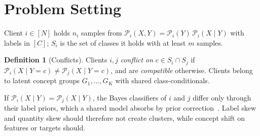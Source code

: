 \documentclass[journal]{IEEEtran}
\theoremstyle{definition}
\newtheorem{definition}{Definition}
\newcommand{\cP}{\mathcal{P}}
\begin{document}
\begin{table}[t]
\centering
\caption{Positioning. Cat.: server-/client-side/metadata. LS: invariant to label skew by design. QS: treats quantity skew. Priv.: formal privacy of the clustering signal. Expl./Cert.: explanations/certificates of the grouping. ``--'': not claimed as far as we could verify.}\label{tab:position}
\scriptsize\setlength{\tabcolsep}{2pt}
\end{table}

\section{Problem Setting}\label{sec:setting}
Client $i\in[N]$ holds $n_i$ samples from $\cP_i(X,Y)=\cP_i(Y)\,\cP_i(X\mid Y)$ with labels in $[C]$; $S_i$ is the set of classes it holds with at least $m$ samples.
\begin{definition}[Conflicts]\label{def:concept}
Clients $i,j$ \emph{conflict on} $c\in S_i\cap S_j$ if $\cP_i(X\mid Y=c)\neq\cP_j(X\mid Y=c)$, and are \emph{compatible} otherwise. Clients belong to latent concept groups $G_1,\dots,G_K$ with shared class-conditionals.
\end{definition}
If $\cP_i(X\mid Y)=\cP_j(X\mid Y)$, the Bayes classifiers of $i$ and $j$ differ only through their label priors, which a shared model absorbs by prior correction~\cite{lipton2018labelshift,menon2021logit}. Label skew and quantity skew should therefore not create clusters, while concept shift on features or targets should.
\end{document}
